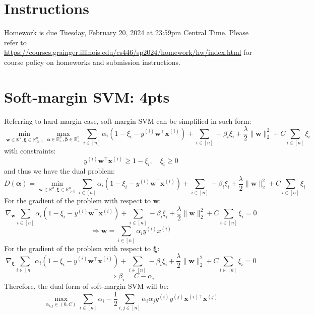 \documentclass[12pt]{article}
\begin{document}
\singlespacing

\renewcommand{\familydefault}{\rmdefault}


\section{Instructions}

Homework is due Tuesday, February 20, 2024 at 23:59pm Central Time.
Please refer to \url{https://courses.grainger.illinois.edu/cs446/sp2024/homework/hw/index.html} for course policy on homeworks and submission instructions.

\section{Soft-margin SVM: 4pts}
Referring to hard-margin case, soft-margin SVM can be simplified in such form:
\[\min_{\boldsymbol{w} \in \mathbb{R}^d,\boldsymbol{\xi} \in \mathbb{R}^n_{\geq 0}} 
\max_{\boldsymbol{\alpha} \in \mathbb{R}^n_+, \boldsymbol{\beta} \in \mathbb{R}^n_+} 
\sum_{i \in [n]} \alpha_i (1 - \xi_i - y^{(i)} \boldsymbol{w}^{\top} \boldsymbol{x}^{(i)}) 
+ \sum_{i \in [n]} -\beta_i \xi_i
+ \frac{\lambda}{2}\|\boldsymbol{w}\|_2^2
+ C \sum_{i \in [n]}\xi_i\]
with constraints:
\[y^{(i)} \boldsymbol{w}^{\top} \boldsymbol{x}^{(i)} \geq 1 - \xi_i
,\quad
\xi_i \geq 0\]
and thus we have the dual problem:
\[D(\boldsymbol{\alpha}) = 
\min_{\boldsymbol{w} \in \mathbb{R}^d,\boldsymbol{\xi} \in \mathbb{R}^n_{\geq 0}} 
\sum_{i \in [n]} \alpha_i (1 - \xi_i - y^{(i)} \boldsymbol{w}^{\top} \boldsymbol{x}^{(i)})
+ \sum_{i \in [n]} -\beta_i \xi_i
+ \frac{\lambda}{2}\|\boldsymbol{w}\|_2^2
+ C \sum_{i \in [n]}\xi_i\]
For the gradient of the problem with respect to $\boldsymbol{w}$:
\[\nabla_{\boldsymbol{w}}
\sum_{i \in [n]} \alpha_i (1 - \xi_i - y^{(i)} \boldsymbol{w}^{\top} \boldsymbol{x}^{(i)})
+ \sum_{i \in [n]} -\beta_i \xi_i
+ \frac{\lambda}{2}\|\boldsymbol{w}\|_2^2
+ C \sum_{i \in [n]}\xi_i
= 0\]
\[\Rightarrow \boldsymbol{w} = \sum_{i \in [n]} \alpha_i y^{(i)} x^{(i)}\]
For the gradient of the problem with respect to $\boldsymbol{\xi}$:
\[\nabla_{\boldsymbol{\xi}}
\sum_{i \in [n]} \alpha_i (1 - \xi_i - y^{(i)} \boldsymbol{w}^{\top} \boldsymbol{x}^{(i)})
+ \sum_{i \in [n]} -\beta_i \xi_i
+ \frac{\lambda}{2}\|\boldsymbol{w}\|_2^2
+ C \sum_{i \in [n]}\xi_i
= 0\]
\[\Rightarrow \beta_i = C - \alpha_i\]
Therefore, the dual form of soft-margin SVM will be:
\[\max_{\alpha_{i,j} \in (0, C)}
\sum_{i \in [n]} \alpha_i - 
\frac{1}{2}\sum_{i,j \in [n]}\alpha_i\alpha_j y^{(i)} y^{(j)} 
\boldsymbol{x}^{(i)\top} \boldsymbol{x}^{(j)}\]
\newpage
\end{document}
